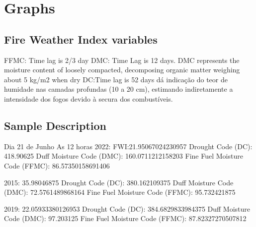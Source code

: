 \chapter{Graphs}
\label{sec:graphs}


\section{Fire Weather Index variables}
FFMC: Time lag is 2/3 day
DMC: Time Lag is 12 days. DMC represents the moisture content of loosely compacted, decomposing organic matter weighing about 5 kg/m2 when dry \cite{wikifire}
DC:Time lag is 52 days \cite{AICC} dá indicação do teor de humidade nas camadas
profundas (10 a 20 cm), estimando indiretamente a intensidade dos fogos devido à secura dos
combustíveis.

\section{Sample Description}

Dia 21 de Junho As 12 horas
2022:
FWI:21.95067024230957
Drought Code (DC):  418.90625
Duff Moisture Code (DMC):  160.0711212158203
Fine Fuel Moisture Code (FFMC):  86.57350158691406

2015:
35.98046875
Drought Code (DC):  380.162109375
Duff Moisture Code (DMC):  72.5761489868164
Fine Fuel Moisture Code (FFMC):  95.732421875

2019:
22.05933380126953
Drought Code (DC):  384.6829833984375
Duff Moisture Code (DMC):  97.203125
Fine Fuel Moisture Code (FFMC):  87.82327270507812

